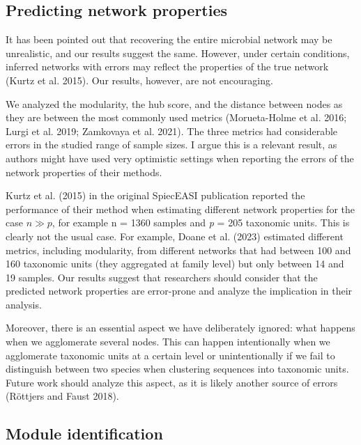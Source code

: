 \documentclass[
  a4paper,
]{article}
\begin{document}
\hypertarget{predicting-network-properties-1}{%
\subsection{Predicting network
properties}\label{predicting-network-properties-1}}

It has been pointed out that recovering the entire microbial network may
be unrealistic, and our results suggest the same. However, under certain
conditions, inferred networks with errors may reflect the properties of
the true network (Kurtz et al. 2015). Our results, however, are not
encouraging.

We analyzed the modularity, the hub score, and the distance between
nodes as they are between the most commonly used metrics (Morueta-Holme
et al. 2016; Lurgi et al. 2019; Zamkovaya et al. 2021). The three
metrics had considerable errors in the studied range of sample sizes. I
argue this is a relevant result, as authors might have used very
optimistic settings when reporting the errors of the network properties
of their methods.

Kurtz et al. (2015) in the original SpiecEASI publication reported the
performance of their method when estimating different network properties
for the case \(n\gg p\), for example n = 1360 samples and \emph{p} = 205
taxonomic units. This is clearly not the usual case. For example, Doane
et al. (2023) estimated different metrics, including modularity, from
different networks that had between 100 and 160 taxonomic units (they
aggregated at family level) but only between 14 and 19 samples. Our
results suggest that researchers should consider that the predicted
network properties are error-prone and analyze the implication in their
analysis.

Moreover, there is an essential aspect we have deliberately ignored:
what happens when we agglomerate several nodes. This can happen
intentionally when we agglomerate taxonomic units at a certain level or
unintentionally if we fail to distinguish between two species when
clustering sequences into taxonomic units. Future work should analyze
this aspect, as it is likely another source of errors (Röttjers and
Faust 2018).

\hypertarget{module-identification-2}{%
\subsection{Module identification}\label{module-identification-2}}
\end{document}
